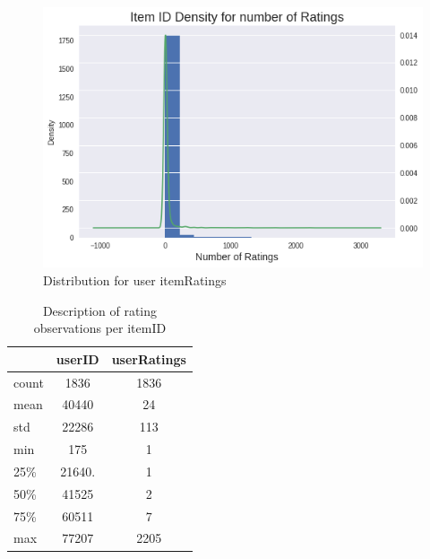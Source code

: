 \documentclass[letterpaper, 10 pt, conference]{ieeeconf}  %
\begin{document}
\begin{enumerate}
\begin{itemize}
\begin{figure}[h]
            \includegraphics[scale=0.4]{itemid-rating-frec.png}
            \centering
            \caption{Distribution for user itemRatings}
            \label{fig:itemid-rating-frec}
        \end{figure}
        
       
        \begin{table}[]
        \begin{tabular}{@{}l|c|c|@{}}
        \cmidrule & \cellcolor[HTML]{DAE8FC}userID & \cellcolor[HTML]{DAE8FC}userRatings \\ \midrule
        \multicolumn{1}{|l|}{\cellcolor[HTML]{DAE8FC}count} & 1836                           & 1836                                \\ \midrule
        \multicolumn{1}{|l|}{\cellcolor[HTML]{DAE8FC}mean}  & 40440                          & 24                                  \\ \midrule
        \multicolumn{1}{|l|}{\cellcolor[HTML]{DAE8FC}std}   & 22286                          & 113                                 \\ \midrule
        \multicolumn{1}{|l|}{\cellcolor[HTML]{DAE8FC}min}   & 175                            & 1                                   \\ \midrule
        \multicolumn{1}{|l|}{\cellcolor[HTML]{DAE8FC}25\%}  & 21640.                         & 1                                   \\ \midrule
        \multicolumn{1}{|l|}{\cellcolor[HTML]{DAE8FC}50\%}  & 41525                          & 2                                   \\ \midrule
        \multicolumn{1}{|l|}{\cellcolor[HTML]{DAE8FC}75\%}  & 60511                          & 7                                   \\ \midrule
        \multicolumn{1}{|l|}{\cellcolor[HTML]{DAE8FC}max}   & 77207                          & 2205                                \\ \bottomrule
        \end{tabular}
        \caption{Description of rating observations per itemID}
        \label{table:rating-observations-per-itemID}
        \end{table}
        

\end{itemize}
\end{enumerate}
\end{document}
